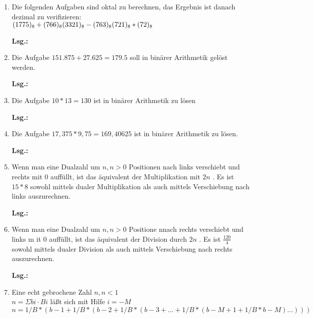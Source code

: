 \documentclass[12pt,a4paper]{scrreprt}
\newcommand{\Lsg}{\par \textbf{Lsg.: }}
\begin{document}
\begin{enumerate}
\Lsg%

\item Die folgenden Aufgaben sind oktal zu berechnen, das Ergebnis ist danach dezimal zu verifizieren: \\
\begin{math}
(1775)_8 + (766)_8 \\
(3321)_8 - (763)_8 \\
(721)_8 * (72)_8
\end{math}

\Lsg%

\item Die Aufgabe $151.875 + 27.625 = 179.5$ soll in binärer Arithmetik gelöst werden.

\Lsg%

\item Die Aufgabe $10*13=130$ ist in binärer Arithmetik zu lösen

\Lsg%

\item Die Aufgabe $17,375*9,75 = 169,40625$ ist in binärer Arithmetik zu lösen.

\Lsg%

\item Wenn man eine Dualzahl um $n, n>0$ Positionen nach links verschiebt und rechts mit $0$ auffüllt, ist das äquivalent der Multiplikation mit $2 n$ . Es ist $15*8$ sowohl mittels dualer Multiplikation als auch mittels Verschiebung nach links auszurechnen.

\Lsg%

\item Wenn man eine Dualzahl um $n, n>0$ Positione nnach rechts verschiebt und links m it $0$ auffüllt, ist das äquivalent der Division durch $2n$ . Es ist $\frac{120}{4}$ sowohl mittels dualer Division als auch mittels Verschiebung nach rechts auszurechnen.

\Lsg%

\item Eine echt gebrochene Zahl $n, n<1$ \\
\begin{math}
n =
\Sigma
bi \cdot B
i
\end{math}
läßt sich mit Hilfe
$i = -M$
\begin{math}
n = 1/B*(b -1 + 1 / B * ( b -2 + 1/B*(b -3 + ... + 1/B*(b -M +1 + 1 / B * b -M ) \ldots)))
\end{math}


\end{enumerate}
\end{document}
